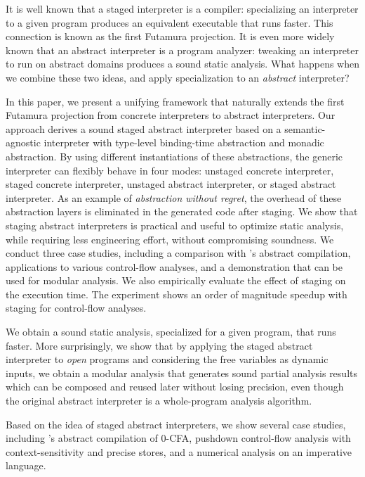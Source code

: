 It is well known that a staged interpreter is a compiler: specializing an
interpreter to a given program produces an equivalent executable that runs faster.
This connection is known as the first Futamura projection.
It is even more widely known that an abstract interpreter is a program analyzer:
tweaking an interpreter to run on abstract domains produces a sound static
analysis. What happens when we combine these two ideas, and apply specialization to
an \emph{abstract} interpreter?

In this paper, we present a unifying framework that naturally extends the first
Futamura projection from concrete interpreters to abstract interpreters. Our
approach derives a sound staged abstract interpreter based on a
semantic-agnostic interpreter with type-level binding-time abstraction and
monadic abstraction. By using different instantiations of these abstractions,
the generic interpreter can flexibly behave in four modes: unstaged concrete
interpreter, staged concrete interpreter, unstaged abstract interpreter, or
staged abstract interpreter. As an example of \emph{abstraction without regret},
the overhead of these abstraction layers is eliminated in the generated code
after staging. We show that staging abstract interpreters is practical and
useful to optimize static analysis, while requiring less engineering effort,
without compromising soundness. We conduct three case studies, including a
comparison with \citeauthor{Boucher:1996:ACN:647473.727587}'s abstract
compilation, applications to various control-flow analyses, and a demonstration
that can be used for modular analysis. We also empirically evaluate the effect
of staging on the execution time. The experiment shows an order of magnitude
speedup with staging for control-flow analyses.

\iffalse
We obtain a sound static analysis, specialized for
a given program, that runs faster. More surprisingly, we show that by applying
the staged abstract interpreter to \textit{open} programs and considering the
free variables as dynamic inputs, we obtain a modular analysis that generates
sound partial analysis results which can be composed and reused later without
losing precision, even though the original abstract interpreter is a
whole-program analysis algorithm.

Based on the idea of staged abstract interpreters, we show several case studies,
including \citeauthor{Boucher:1996:ACN:647473.727587}'s abstract compilation of
0-CFA, pushdown control-flow analysis with context-sensitivity and precise
stores, and a numerical analysis on an imperative language.


